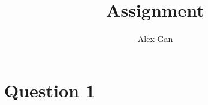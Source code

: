 \documentclass{article}
\title{Assignment}
\author{Alex Gan}
\begin{document}
\maketitle

\section*{Question 1} 
\end{document}
